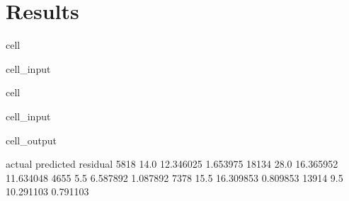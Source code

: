 \documentclass[letterpaper,10pt,english]{sphinxmanual}
\begin{document}
\section{Results}
\label{\detokenize{Automatidata_Regression Analysis:results}}
\begin{sphinxuseclass}{cell}
\begin{sphinxuseclass}{cell_input}
\begin{sphinxVerbatim}[commandchars=\\\{\}]
  \PYG{p}{[}\PYG{p}{]}
\PYG{p}{[}\PYG{p}{]}  \PYG{p}{[}\PYG{p}{]}  \PYG{p}{[}\PYG{p}{]}
\end{sphinxVerbatim}

\end{sphinxuseclass}
\end{sphinxuseclass}
\begin{sphinxuseclass}{cell}
\begin{sphinxuseclass}{cell_input}
\begin{sphinxVerbatim}[commandchars=\\\{\}]
\end{sphinxVerbatim}

\end{sphinxuseclass}
\begin{sphinxuseclass}{cell_output}
\begin{sphinxVerbatim}[commandchars=\\\{\}]
       actual  predicted   residual
5818     14.0  12.346025   1.653975
18134    28.0  16.365952  11.634048
4655      5.5   6.587892  \PYGZhy{}1.087892
7378     15.5  16.309853  \PYGZhy{}0.809853
13914     9.5  10.291103  \PYGZhy{}0.791103
\end{sphinxVerbatim}

\end{sphinxuseclass}
\end{sphinxuseclass}
\end{document}

